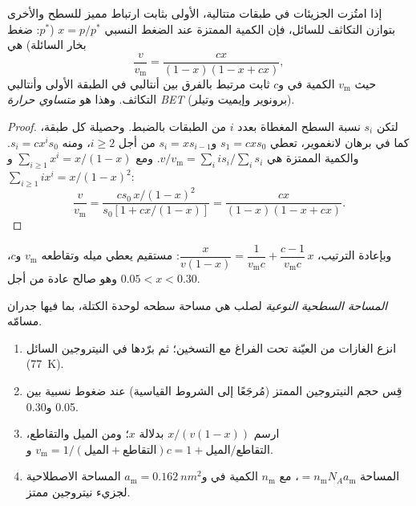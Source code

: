 \begin{theorem}\label{thm:b3:surfaces-catalysis:bet}
إذا امتُزت الجزيئات في طبقات متتالية، الأولى بثابت ارتباط
مميز للسطح والأخرى بتوازن التكاثف
للسائل، فإن الكمية الممتزة عند الضغط النسبي $x = p/p^*$ ($p^*$: ضغط بخار
 السائلة) هي
\[
  \frac{v}{v_{\mathrm m}} = \frac{cx}{(1 - x)(1 - x + cx)},
\]
حيث $v_{\mathrm m}$ الكمية في  و$c$ ثابت مرتبط
بالفرق بين أنتالبي  في الطبقة الأولى وأنتالبي
التكاثف. وهذا هو \emph{متساوي حرارة BET} (برونوير
وإيميت وتيلر).
\end{theorem}

\begin{proof}
لتكن $s_i$ نسبة السطح المغطاة بعدد $i$ من الطبقات بالضبط. وحصيلة
كل طبقة، كما في برهان لانغموير، تعطي $s_1 = cxs_0$ و$s_i =
xs_{i-1}$ من أجل $i \ge 2$، ومنه $s_i = cx^is_0$. والكمية الممتزة هي $v/v_{\mathrm m} =
\sum_iis_i/\sum_is_i$. ومع $\sum_{i\ge1}x^i = x/(1 - x)$ و$\sum_{i\ge1}ix^i = x/(1 - x)^2$:
\[
  \frac{v}{v_{\mathrm m}} = \frac{cs_0\,x/(1 - x)^2}{s_0[1 + cx/(1 - x)]} = \frac{cx}{(1 - x)(1 - x + cx)} .
\]
\end{proof}

وبإعادة الترتيب، $\dfrac{x}{v(1 - x)} = \dfrac{1}{v_{\mathrm m}c} + \dfrac{c - 1}{v_{\mathrm m}c}\,x$: مستقيم يعطي ميله
وتقاطعه $v_{\mathrm m}$ و$c$، وهو صالح عادة من أجل $0.05 < x < 0.30$.

\begin{definition}\label{def:b3:surfaces-catalysis:surface-area}
\emph{المساحة السطحية النوعية} لصلب هي
مساحة سطحه لوحدة الكتلة، بما فيها جدران مسامّه.
\end{definition}

\begin{method}\label{met:b3:surfaces-catalysis:bet-area}
\begin{enumerate}
  \item انزع الغازات من العيّنة تحت الفراغ مع التسخين؛ ثم برّدها في النيتروجين السائل
        (\qty{77}{K}).
  \item قِس حجم النيتروجين الممتز (مُرجَعًا إلى الشروط القياسية)
        عند ضغوط نسبية بين 0.05 و0.30.
  \item ارسم $x/(v(1 - x))$ بدلالة $x$؛ ومن الميل والتقاطع،
        $v_{\mathrm m} = 1/(\text{الميل} + \text{التقاطع})$ و$c = 1 + \text{الميل}/\text{التقاطع}$.
  \item المساحة $= n_{\mathrm m}N_Aa_{\mathrm m}$، مع $n_{\mathrm m}$ الكمية في  و$a_{\mathrm m} = \qty{0.162}{nm^2}$
        المساحة الاصطلاحية لجزيء نيتروجين ممتز.
\end{enumerate}
\end{method}

